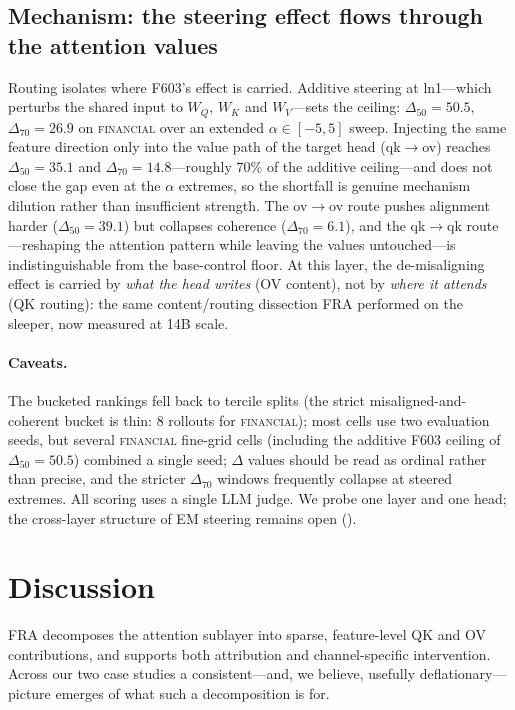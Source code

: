 \documentclass{article}
\theoremstyle{plain}
\theoremstyle{definition}
\theoremstyle{remark}
\newcommand{\WQ}{W_Q}
\newcommand{\WK}{W_K}
\newcommand{\WV}{W_V}
\begin{document}
\subsection{Mechanism: the steering effect flows through the attention values}
\label{sec:em_mechanism}

Routing isolates where F603's effect is carried. Additive steering at ln1---which perturbs the shared input to $\WQ$, $\WK$ and $\WV$---sets the ceiling: $\Delta_{50} = 50.5$, $\Delta_{70} = 26.9$ on \textsc{financial} over an extended $\alpha \in [-5,5]$ sweep. Injecting the same feature direction only into the value path of the target head (qk$\to$ov) reaches $\Delta_{50} = 35.1$ and $\Delta_{70} = 14.8$---roughly $70\%$ of the additive ceiling---and does not close the gap even at the $\alpha$ extremes, so the shortfall is genuine mechanism dilution rather than insufficient strength. The ov$\to$ov route pushes alignment harder ($\Delta_{50} = 39.1$) but collapses coherence ($\Delta_{70} = 6.1$), and the qk$\to$qk route---reshaping the attention pattern while leaving the values untouched---is indistinguishable from the base-control floor. At this layer, the de-misaligning effect is carried by \emph{what the head writes} (OV content), not by \emph{where it attends} (QK routing): the same content/routing dissection FRA performed on the sleeper, now measured at 14B scale.

\paragraph{Caveats.} The bucketed rankings fell back to tercile splits (the strict misaligned-and-coherent bucket is thin: 8 rollouts for \textsc{financial}); most cells use two evaluation seeds, but several \textsc{financial} fine-grid cells (including the additive F603 ceiling of $\Delta_{50} = 50.5$) combined a single seed; $\Delta$ values should be read as ordinal rather than precise, and the stricter $\Delta_{70}$ windows frequently collapse at steered extremes. All scoring uses a single LLM judge. We probe one layer and one head; the cross-layer structure of EM steering remains open ().

\section{Discussion}
\label{sec:discussion}
FRA decomposes the attention sublayer into sparse, feature-level QK and OV contributions, and supports both attribution and channel-specific intervention. Across our two case studies a consistent---and, we believe, usefully deflationary---picture emerges of what such a decomposition is for.
\end{document}
